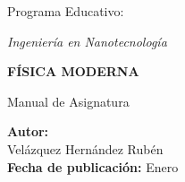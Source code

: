 \documentclass[oneside,12pt]{book}
\begin{document}
\begin{titlepage}
\begin{center}
			
			\vspace{0.5cm}
			
			{\Large\textcolor{uteqDarkBlue}{Programa Educativo:}}
			
			\vspace{0.4cm}
			{\Large\textit{Ingeniería en Nanotecnología}}
			
			\vspace{2cm}
			
			{\fontsize{24}{28}\selectfont\textbf{\textcolor{uteqGreen}{FÍSICA MODERNA}}}
			
			\vspace{0.8cm}
			{\Large Manual de Asignatura \the\year}
			
			\vspace{3.5cm}
			
			\begin{minipage}{0.8\textwidth}
				\begin{flushright}
					\textbf{Autor:} \\
					Velázquez Hernández Rubén \\
					\vspace{0.3cm}
					\textbf{Fecha de publicación:} Enero \the\year
				\end{flushright}
			\end{minipage}
			
			\vfill
			
			
		\end{center}
	\end{titlepage}
	
	\restoregeometry
	
	\pagestyle{fancy}
	
	\tableofcontents
	
	

	\mainmatter

	
	
	
	
		
\end{document}
